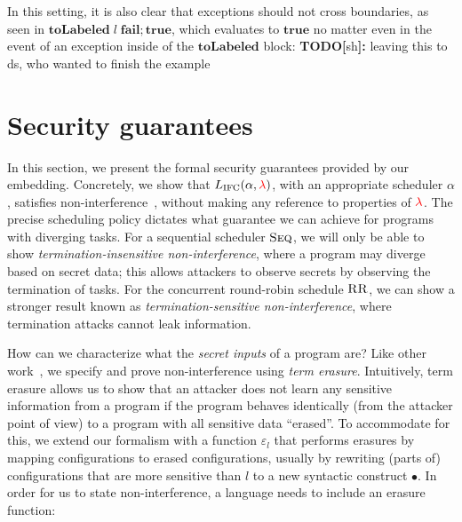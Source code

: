 \documentclass{sigplanconf}
\newcommand{\Red}[1]{{\color{red} #1}}
\newcommand{\todo}[2]{\Red{\textbf{TODO[}#1\textbf{]:} #2}} %
\begin{document}
In this setting, it is also clear that exceptions should not cross boundaries,
as seen in \ensuremath{\mathbf{toLabeled}\;l\;\mathbf{fail};\mathbf{true}}, which evaluates to \ensuremath{\mathbf{true}} no matter even in
the event of an exception inside of the \ensuremath{\mathbf{toLabeled}} block:
\todo{sh}{leaving this to ds, who wanted to finish the example}


\section{Security guarantees}
\label{sec:formal}

In this section, we present the formal security guarantees provided by
our embedding.
%
Concretely, we show that \ensuremath{L_\text{IFC}(\alpha,\Red{\lambda})}, with an appropriate
scheduler \ensuremath{\alpha}, satisfies non-interference~\cite{Goguen82},
without making any reference to properties of \ensuremath{\Red{\lambda}}.
%
The precise scheduling policy dictates
what guarantee we can achieve for programs with diverging tasks.
For a sequential scheduler \ensuremath{\textsc{Seq}}, we will only be able to show
\emph{termination-insensitive non-interference}, where a program
may diverge based on secret data; this allows attackers to observe
secrets by observing the termination of tasks.
For the concurrent round-robin schedule \ensuremath{\textsc{RR}},
we can show a stronger result known as
\emph{termination-sensitive non-interference},
where termination attacks cannot leak information.

How can we characterize what the \emph{secret inputs} of a program are?  Like
other work~\cite{Li+:2010:arrows,Russo+:Haskell08,lio,stefan:addressing-covert},
we specify and prove non-interference using \emph{term erasure}.
%
Intuitively, term erasure allows us to show that an attacker does not learn
any sensitive information from a program if the program behaves identically
(from the attacker point of view) to a program with all sensitive data
``erased''.
%
To accommodate for this, we extend our formalism with a function \ensuremath{\varepsilon_{l}} that
performs erasures by mapping configurations to erased configurations,
usually by rewriting (parts of) configurations that are more sensitive
than \ensuremath{l} to a new syntactic construct \ensuremath{\bullet}.
%
In order for us to state non-interference, a language needs to include an
erasure function:
\end{document}
